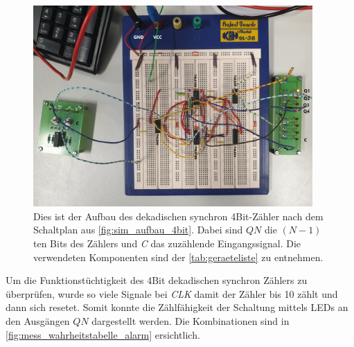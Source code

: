 \documentclass[12pt,english,ngerman]{scrartcl}
\begin{document}
\begin{figure}[H]
  \centering
    \includegraphics[width=0.95\textwidth]{./figures/messungen/4bit/aufbau.png}
  \caption{Dies ist der Aufbau des dekadischen synchron 4Bit-Zähler nach dem
  Schaltplan aus \autoref{fig:sim_aufbau_4bit}.
Dabei sind $QN$ die $(N-1)$ten Bits des Zählers und \textit{C} das zuzählende
Eingangssignal.
  Die verwendeten Komponenten
  sind der \autoref{tab:geraeteliste} zu entnehmen.}
  \label{fig:mess_aufbau_4bit}
\end{figure}

Um die Funktionstüchtigkeit des 4Bit dekadischen synchron Zählers zu
überprüfen, wurde so viele Signale bei \textit{CLK} damit der Zähler bis 10
zählt und dann sich resetet. Somit konnte die Zählfähigkeit der Schaltung
mittels LEDs an den Ausgängen $QN$ dargestellt werden. Die Kombinationen sind
in \autoref{fig:mess_wahrheitstabelle_alarm} ersichtlich.
\end{document}

